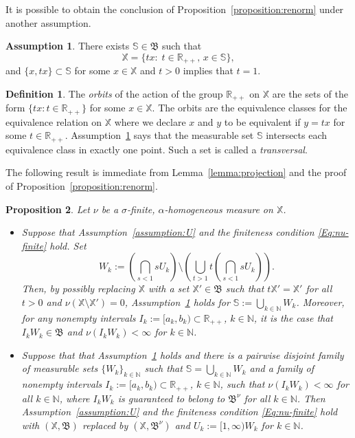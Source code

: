\documentclass[12pt]{amsart}
\numberwithin{equation}{section}
\numberwithin{figure}{section}
\theoremstyle{plain} \newtheorem{theorem}{Theorem}[section]
\theoremstyle{plain} \newtheorem{proposition}[theorem]{Proposition}
\theoremstyle{plain} \newtheorem{lemma}[theorem]{Lemma}
\theoremstyle{plain} \newtheorem{corollary}[theorem]{Corollary}
\theoremstyle{definition} \newtheorem{definition}[theorem]{Definition}
\theoremstyle{definition} \newtheorem{notation}[theorem]{Notation}
\theoremstyle{remark} \newtheorem{remark}[theorem]{Remark}
\theoremstyle{remark} \newtheorem{example}[theorem]{Example}
\theoremstyle{definition} \newtheorem{assumption}{Assumption}
\newcommand{\bN}{\mathbb{N}}
\newcommand{\bR}{\mathbb{R}}
\newcommand{\bS}{\mathbb{S}}
\newcommand{\bX}{\mathbb{X}}
\newcommand{\salg}{\mathfrak{B}}
\begin{document}
It is possible to obtain the conclusion of
Proposition~\ref{proposition:renorm} under another assumption.

\begin{assumption}
  \label{assumption:X}
  There exists $\bS\in\salg$ such that 
  \begin{displaymath}
    \bX=\{tx:\; t\in\bR_{++}, \, x\in\bS\},
  \end{displaymath}
  and $\{x,tx\}\subset\bS$ for some $x\in\bX$ and $t>0$ implies that
  $t=1$. 
\end{assumption}

\begin{definition}
  The {\em orbits} of the action of the group $\bR_{++}$ on $\bX$ are
  the sets of the form $\{t x : t \in \bR_{++}\}$ for some $x \in
  \bX$.  The orbits are the equivalence classes for the equivalence
  relation on $\bX$ where we declare $x$ and $y$ to be equivalent if
  $y = t x$ for some $t \in \bR_{++}$.  Assumption~\ref{assumption:X}
  says that the measurable set $\bS$ intersects each equivalence class
  in exactly one point. Such a set is called a \emph{transversal}.
\end{definition}

The following result is immediate from Lemma~\ref{lemma:projection} and the
proof of Proposition~\ref{proposition:renorm}.

\begin{proposition}
  \label{proposition:sphere}
  Let $\nu$ be a $\sigma$-finite, $\alpha$-homogeneous measure on $\bX$.
  \begin{itemize}
  \item[i)] Suppose that Assumption~\ref{assumption:U} and the
    finiteness condition \eqref{Eq:nu-finite} hold.  Set
    \[
    W_k 
    := \left(\bigcap_{s<1} s U_k\right) 
   \setminus \left(\bigcup_{t > 1} t \left(\bigcap_{s<1} s U_k\right)\right).
    \]
    Then, by possibly replacing $\bX$ with a set $\bX' \in \salg$ such
    that $t \bX' = \bX'$ for all $t >0$ and $\nu(\bX \setminus
    \bX')=0$, Assumption~\ref{assumption:X} holds for $\bS :=
    \bigcup_{k \in \bN} W_k$.  Moreover, for any nonempty intervals
    $I_k := [a_k, b_k) \subset \bR_{++}$, $k \in \bN$, it is the
    case that $I_k W_k \in \salg$ and $\nu(I_k W_k)<\infty$ for
    $k\in\bN$.
  \item[ii)] Suppose that that Assumption~\ref{assumption:X} holds and
    there is a pairwise disjoint family of measurable sets
    $\{W_k\}_{k\in\bN}$ such that $\bS = \bigcup_{k \in \bN} W_k$ and
    a family of nonempty intervals $I_k := [a_k, b_k) \subset
    \bR_{++}$, $k \in \bN$, such that $\nu(I_k W_k)<\infty$ for
    all $k\in\bN$, where $I_k W_k$ is guaranteed to belong to
    $\salg^\nu$ for all $k \in \bN$.  Then
    Assumption~\ref{assumption:U} and the finiteness condition
    \eqref{Eq:nu-finite} hold with $(\bX,\salg)$ replaced by $(\bX,
    \salg^\nu)$ and $U_k := [1,\infty)W_k$ for $k\in\bN$.
  \end{itemize}
\end{proposition}
\end{document}
